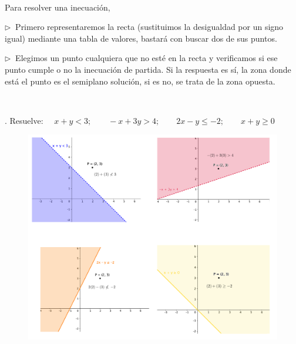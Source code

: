 \vspace{5mm}
\begin{destacado}
$\ $

Para resolver una inecuación,

\begin{adjustwidth}{20pt}{10pt}
\vspace{4mm} $\triangleright \ $ Primero representaremos la recta (sustituimos la desigualdad por un signo igual) mediante una tabla de valores, bastará con buscar dos de sus puntos.

\vspace{4mm} $\triangleright \ $ Elegimos un punto cualquiera que no esté en la recta y verificamos si ese punto cumple o no la inecuación de partida. Si la respuesta es sí, la zona donde está el punto es el semiplano solución, si es no, se trata de la zona opuesta.	

$\ $
\end{adjustwidth}

\end{destacado}

\vspace{5mm}
\begin{example}
.	Resuelve: $\quad x+y<3;\qquad -x+3y>4;\qquad 2x-y\le -2;\qquad x+y\ge 0$	
\end{example}

\begin{figure}[H]
	\centering
	\includegraphics[width=1\textwidth]{imagenes/img07.png}
\end{figure}

